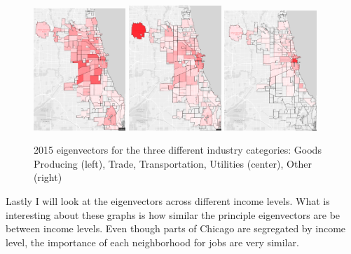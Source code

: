 \documentclass{article}
\theoremstyle{definition}
\theoremstyle{remark}
\begin{document}
\begin{figure}[H]
    \centering
    \includegraphics[width=0.31\textwidth]{Jobs-SI001-2015}
    \includegraphics[width=0.31\textwidth]{Jobs-SI002-2015}
    \includegraphics[width=0.31\textwidth]{Jobs-SI003-2015}
    \caption{2015 eigenvectors for the three different industry categories: Goods Producing (left), Trade, Transportation, Utilities (center), Other (right)}
    \label{fig:Jobs-S000-2008}
\end{figure}

Lastly I will look at the eigenvectors across different income levels.  What is interesting about these graphs is how similar the principle eigenvectors are be between income levels.  Even though parts of Chicago are segregated by income level, the importance of each neighborhood for jobs are very similar.
\end{document}

